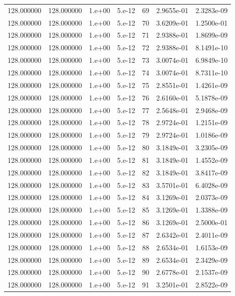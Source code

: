 \begin{table}[htbp]
\begin{tabular}{rrrrrrr}
128.000000 & 128.000000 & 1.e+00 & 5.e-12 & 69 & 2.9655e-01 & 2.3283e-09 \\
128.000000 & 128.000000 & 1.e+00 & 5.e-12 & 70 & 3.6209e-01 & 1.2500e-01 \\
128.000000 & 128.000000 & 1.e+00 & 5.e-12 & 71 & 2.9388e-01 & 1.8699e-09 \\
128.000000 & 128.000000 & 1.e+00 & 5.e-12 & 72 & 2.9388e-01 & 8.1491e-10 \\
128.000000 & 128.000000 & 1.e+00 & 5.e-12 & 73 & 3.0074e-01 & 6.9849e-10 \\
128.000000 & 128.000000 & 1.e+00 & 5.e-12 & 74 & 3.0074e-01 & 8.7311e-10 \\
128.000000 & 128.000000 & 1.e+00 & 5.e-12 & 75 & 2.8551e-01 & 1.4261e-09 \\
128.000000 & 128.000000 & 1.e+00 & 5.e-12 & 76 & 2.6160e-01 & 5.1878e-09 \\
128.000000 & 128.000000 & 1.e+00 & 5.e-12 & 77 & 2.5648e-01 & 2.9468e-09 \\
128.000000 & 128.000000 & 1.e+00 & 5.e-12 & 78 & 2.9724e-01 & 1.2151e-09 \\
128.000000 & 128.000000 & 1.e+00 & 5.e-12 & 79 & 2.9724e-01 & 1.0186e-09 \\
128.000000 & 128.000000 & 1.e+00 & 5.e-12 & 80 & 3.1849e-01 & 3.2305e-09 \\
128.000000 & 128.000000 & 1.e+00 & 5.e-12 & 81 & 3.1849e-01 & 1.4552e-09 \\
128.000000 & 128.000000 & 1.e+00 & 5.e-12 & 82 & 3.1849e-01 & 3.8417e-09 \\
128.000000 & 128.000000 & 1.e+00 & 5.e-12 & 83 & 3.5701e-01 & 6.4028e-09 \\
128.000000 & 128.000000 & 1.e+00 & 5.e-12 & 84 & 3.1269e-01 & 2.0373e-09 \\
128.000000 & 128.000000 & 1.e+00 & 5.e-12 & 85 & 3.1269e-01 & 1.3388e-09 \\
128.000000 & 128.000000 & 1.e+00 & 5.e-12 & 86 & 3.1269e-01 & 2.5000e-01 \\
128.000000 & 128.000000 & 1.e+00 & 5.e-12 & 87 & 2.6342e-01 & 2.4011e-09 \\
128.000000 & 128.000000 & 1.e+00 & 5.e-12 & 88 & 2.6534e-01 & 1.6153e-09 \\
128.000000 & 128.000000 & 1.e+00 & 5.e-12 & 89 & 2.6534e-01 & 2.3429e-09 \\
128.000000 & 128.000000 & 1.e+00 & 5.e-12 & 90 & 2.6778e-01 & 2.1537e-09 \\
128.000000 & 128.000000 & 1.e+00 & 5.e-12 & 91 & 3.2501e-01 & 2.8522e-09 \\

\end{tabular}
\end{table}
